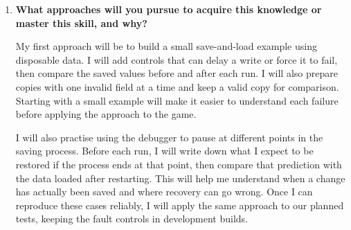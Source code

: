 \documentclass[10pt,titlepage]{article}
\begin{document}
\begin{enumerate}
    \item \textbf{What approaches will you pursue to acquire this
    knowledge or master this skill, and why?}

    My first approach will be to build a small save-and-load example using
    disposable data. I will add controls that can delay a write or force it
    to fail, then compare the saved values before and after each run. I will
    also prepare copies with one invalid field at a time and keep a valid
    copy for comparison. Starting with a small example will make it easier
    to understand each failure before applying the approach to the game.

    I will also practise using the debugger to pause at different points
    in the saving process. Before each run, I will write down what I expect
    to be restored if the process ends at that point, then compare that
    prediction with the data loaded after restarting. This will help me
    understand when a change has actually been saved and where recovery
    can go wrong. Once I can reproduce these cases reliably, I will apply
    the same approach to our planned tests, keeping the fault controls in
    development builds.

\end{enumerate}

\newpage



\end{document}
